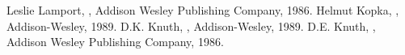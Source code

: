 \documentclass[twocolumn]{maeb2015}
\begin{document}
\nocite{*}


\begin{thebibliography}{1}
Leslie Lamport,
,
\newblock Addison Wesley Publishing Company, 1986.
Helmut Kopka,
,
\newblock Addison-Wesley, 1989.
D.K. Knuth,
,
\newblock Addison-Wesley, 1989.
D.E. Knuth,
,
\newblock Addison Wesley Publishing Company, 1986.
\end{thebibliography}
\end{document}

